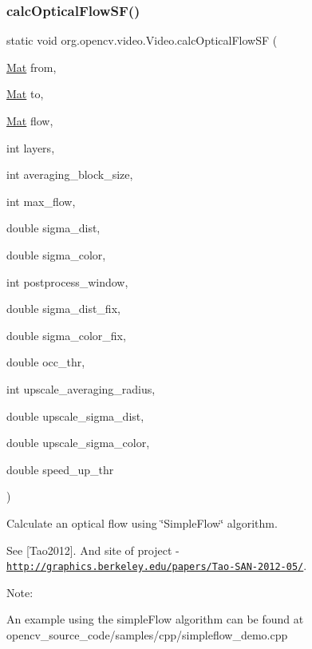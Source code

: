 \subsubsection{\texorpdfstring{calc\+Optical\+Flow\+S\+F()}{calcOpticalFlowSF()}\hspace{0.1cm}{\footnotesize\ttfamily [2/2]}}
{\footnotesize\ttfamily static void org.\+opencv.\+video.\+Video.\+calc\+Optical\+Flow\+SF (\begin{DoxyParamCaption}\item[{\mbox{\hyperlink{classorg_1_1opencv_1_1core_1_1_mat}{Mat}}}]{from,  }\item[{\mbox{\hyperlink{classorg_1_1opencv_1_1core_1_1_mat}{Mat}}}]{to,  }\item[{\mbox{\hyperlink{classorg_1_1opencv_1_1core_1_1_mat}{Mat}}}]{flow,  }\item[{int}]{layers,  }\item[{int}]{averaging\+\_\+block\+\_\+size,  }\item[{int}]{max\+\_\+flow,  }\item[{double}]{sigma\+\_\+dist,  }\item[{double}]{sigma\+\_\+color,  }\item[{int}]{postprocess\+\_\+window,  }\item[{double}]{sigma\+\_\+dist\+\_\+fix,  }\item[{double}]{sigma\+\_\+color\+\_\+fix,  }\item[{double}]{occ\+\_\+thr,  }\item[{int}]{upscale\+\_\+averaging\+\_\+radius,  }\item[{double}]{upscale\+\_\+sigma\+\_\+dist,  }\item[{double}]{upscale\+\_\+sigma\+\_\+color,  }\item[{double}]{speed\+\_\+up\+\_\+thr }\end{DoxyParamCaption})\hspace{0.3cm}{\ttfamily [static]}}

Calculate an optical flow using \char`\"{}\+Simple\+Flow\char`\"{} algorithm.

See \mbox{[}Tao2012\mbox{]}. And site of project -\/ \href{http://graphics.berkeley.edu/papers/Tao-SAN-2012-05/}{\tt http\+://graphics.\+berkeley.\+edu/papers/\+Tao-\/\+S\+A\+N-\/2012-\/05/}.

Note\+:


\begin{DoxyItemize}
\item An example using the simple\+Flow algorithm can be found at opencv\+\_\+source\+\_\+code/samples/cpp/simpleflow\+\_\+demo.\+cpp 
\end{DoxyItemize}


